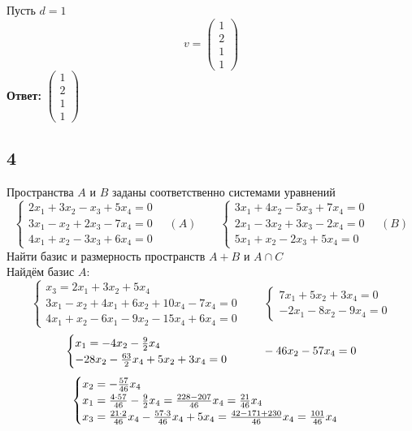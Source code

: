 Пусть $ d = 1 $
$$ v =
\begin{pmatrix}
	1 \\
    2 \\
    1 \\
    1
\end{pmatrix} $$
\textbf{Ответ:} $
\begin{pmatrix}
	1 \\
    2 \\
    1 \\
    1
\end{pmatrix} $

\subsection{4}
Пространства $ A $ и $ B $ заданы соответственно системами уравнений
$$
\begin{cases}
	2x_1 + 3x_2 - x_3 + 5x_4 = 0 \\
    3x_1 - x_2 + 2x_3 - 7x_4 = 0 \\
    4x_1 + x_2 - 3x_3 + 6x_4 = 0
\end{cases} \quad (A) \qquad
\begin{cases}
	3x_1 + 4x_2 - 5x_3 + 7x_4 = 0 \\
    2x_1 - 3x_2 + 3x_3 - 2x_4 = 0 \\
    5x_1 + x_2 - 2x_3 + 5x_4 = 0
\end{cases} \quad (B) $$
Найти базис и размерность пространств $ A + B $ и $ A \cap C $ \\
Найдём базис $ A $:
$$
\begin{cases}
	x_3 = 2x_1 + 3x_2 + 5x_4 \\
    3x_1 - x_2 + 4x_1 + 6x_2 + 10x_4 - 7x_4 = 0 \\
    4x_1 + x_2 - 6x_1 - 9x_2 - 15x_4 + 6x_4 = 0
\end{cases} \qquad
\begin{cases}
	7x_1 + 5x_2 + 3x_4 = 0 \\
    -2x_1 - 8x_2 - 9x_4 = 0
\end{cases} $$
$$
\begin{cases}
	x_1 = -4x_2 - \half[9]x_4 \\
    -28x_2 - \half[63]x_4 + 5x_2 + 3x_4 = 0
\end{cases} \qquad -46x_2 - 57x_4 = 0 $$
$$
\begin{cases}
    x_2 = -\frac{57}{46}x_4 \\
    x_1 = \frac{4 \cdot 57}{46} - \half[9]x_4 = \frac{228 - 207}{46}x_4 = \frac{21}{46}x_4 \\
    x_3 = \frac{21 \cdot 2}{46}x_4 - \frac{57 \cdot 3}{46}x_4 + 5x_4 = \frac{42 - 171 + 230}{46}x_4 = \frac{101}{46}x_4
\end{cases} $$
